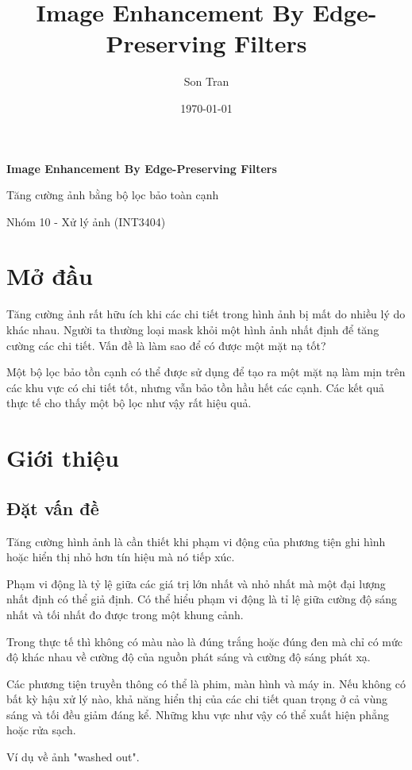 \documentclass[12pt,letterpaper]{report}
\author{Son Tran}
\title{Image Enhancement By Edge-Preserving Filters}
\date{\today}
\begin{document}
\begin{center}
	\Large{
	\textbf{Image Enhancement By Edge-Preserving Filters}
	
	\vspace{5pt}
	\normalsize{Tăng cường ảnh bằng bộ lọc bảo toàn cạnh}

	Nhóm 10 - Xử lý ảnh (INT3404)}

	\vspace{15pt}
\end{center}

    
\section{Mở đầu}
Tăng cường ảnh rất hữu ích khi các chi tiết trong hình ảnh bị mất do nhiều lý do khác nhau. Người ta thường loại mask khỏi một hình ảnh nhất định để tăng cường các chi tiết. Vấn đề  là làm sao để có được một mặt nạ tốt?
	
Một bộ lọc bảo tồn cạnh có thể được sử dụng để tạo ra một mặt nạ làm mịn trên các khu vực có chi tiết tốt, nhưng vẫn bảo tồn hầu hết các cạnh. Các kết quả thực tế cho thấy một bộ lọc như vậy rất hiệu quả.
	
\section{Giới thiệu}

\subsection{Đặt vấn đề}
Tăng cường hình ảnh là cần thiết khi phạm vi động của phương tiện ghi hình hoặc hiển thị nhỏ hơn tín hiệu mà nó tiếp xúc.
    
Phạm vi động là tỷ lệ giữa các giá trị lớn nhất và nhỏ nhất mà một đại lượng nhất định có thể giả định. Có thể hiểu phạm vi động là tỉ lệ giữa cường độ sáng nhất và tối nhất đo được trong một khung cảnh.
    
Trong thực tế thì không có màu nào là đúng trắng hoặc đúng đen mà chỉ có mức độ khác nhau về cường độ của nguồn phát sáng và cường độ sáng phát xạ. 
    
Các phương tiện truyền thông có thể là phim, màn hình và máy in. Nếu không có bất kỳ hậu xử lý nào, khả năng hiển thị của các chi tiết quan trọng ở cả vùng sáng và tối đều giảm đáng kể. Những khu vực như vậy có thể xuất hiện phẳng hoặc rửa sạch.
    
Ví dụ về ảnh "washed out".
        
\end{document}
